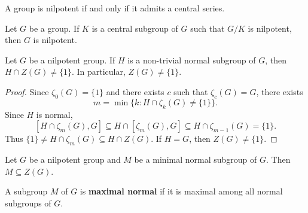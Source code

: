 
\begin{exercise}
	A group is nilpotent if and only if it admits a central series.
\end{exercise}


\begin{exercise}
\label{xca:nilpotente_central}
	Let $G$ be a group. If $K$ is a central subgroup of $G$ such that 
	$G/K$ is nilpotent, then $G$ is nilpotent.
\end{exercise}

\begin{theorem}[Hirsch]
	\label{thm:Z(nilpotent)}
	Let $G$ be a nilpotent group. If $H$ is a non-trivial normal subgroup of $G$, then 
	$H\cap Z(G)\ne\{1\}$. In particular, $Z(G)\ne\{1\}$. 
\end{theorem}

\begin{proof}
	Since $\zeta_0(G)=\{1\}$ and there exists $c$ such that $\zeta_c(G)=G$, there exists  
	\[
	m=\min\{k:H\cap\zeta_k(G)\ne\{1\}\}.
	\]
	Since $H$ is normal, 
	\[
	[H\cap\zeta_m(G),G]\subseteq H\cap[\zeta_m(G),G]\subseteq H\cap\zeta_{m-1}(G)=\{1\}.
	\]
	Thus $\{1\}\ne H\cap\zeta_m(G)\subseteq H\cap Z(G)$. If $H=G$, then $Z(G)\ne\{1\}$. 
\end{proof}

\begin{exercise}
\label{xca:nilpotente_minimalnormal}
	Let $G$ be a nilpotent group and $M$ be a minimal normal subgroup of $G$. 
	Then $M\subseteq Z(G)$.
\end{exercise}


A subgroup $M$ of $G$ is \textbf{maximal normal} if it is maximal
among all normal subgroups of $G$.  

